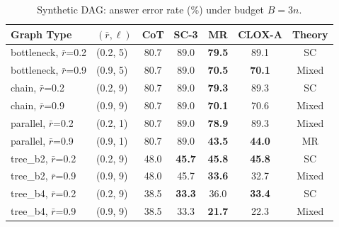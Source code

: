 \begin{table}[t]
\centering
\caption{Synthetic DAG: answer error rate (\%) under budget $B=3n$.}
\label{tab:synthetic}
\small
\begin{tabular}{llccccc}
\toprule
\textbf{Graph Type} & $(\bar{r}, \ell)$ & \textbf{CoT} & \textbf{SC-3} & \textbf{MR} & \textbf{CLOX-A} & \textbf{Theory} \\
\midrule
bottleneck, $\bar{r}$=0.2 & (0.2, 5) & 80.7 & 89.0 & \textbf{79.5} & 89.1 & SC \\
bottleneck, $\bar{r}$=0.9 & (0.9, 5) & 80.7 & 89.0 & \textbf{70.5} & \textbf{70.1} & Mixed \\
chain, $\bar{r}$=0.2 & (0.2, 9) & 80.7 & 89.0 & \textbf{79.3} & 89.3 & SC \\
chain, $\bar{r}$=0.9 & (0.9, 9) & 80.7 & 89.0 & \textbf{70.1} & 70.6 & Mixed \\
parallel, $\bar{r}$=0.2 & (0.2, 1) & 80.7 & 89.0 & \textbf{78.9} & 89.3 & Mixed \\
parallel, $\bar{r}$=0.9 & (0.9, 1) & 80.7 & 89.0 & \textbf{43.5} & \textbf{44.0} & MR \\
tree_b2, $\bar{r}$=0.2 & (0.2, 9) & 48.0 & \textbf{45.7} & \textbf{45.8} & \textbf{45.8} & SC \\
tree_b2, $\bar{r}$=0.9 & (0.9, 9) & 48.0 & 45.7 & \textbf{33.6} & 32.7 & Mixed \\
tree_b4, $\bar{r}$=0.2 & (0.2, 9) & 38.5 & \textbf{33.3} & 36.0 & \textbf{33.4} & SC \\
tree_b4, $\bar{r}$=0.9 & (0.9, 9) & 38.5 & 33.3 & \textbf{21.7} & 22.3 & Mixed \\
\bottomrule
\end{tabular}
\end{table}